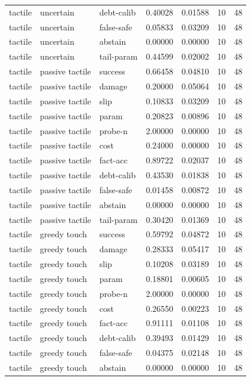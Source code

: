\documentclass{article}
\begin{document}
\begin{center}
\begin{longtable}{lllllll}
tactile & uncertain & debt-calib & 0.40028 & 0.01588 & 10 & 48 \\
tactile & uncertain & false-safe & 0.05833 & 0.03209 & 10 & 48 \\
tactile & uncertain & abstain & 0.00000 & 0.00000 & 10 & 48 \\
tactile & uncertain & tail-param & 0.44599 & 0.02002 & 10 & 48 \\
tactile & passive tactile & success & 0.66458 & 0.04810 & 10 & 48 \\
tactile & passive tactile & damage & 0.20000 & 0.05064 & 10 & 48 \\
tactile & passive tactile & slip & 0.10833 & 0.03209 & 10 & 48 \\
tactile & passive tactile & param & 0.20823 & 0.00896 & 10 & 48 \\
tactile & passive tactile & probe-n & 2.00000 & 0.00000 & 10 & 48 \\
tactile & passive tactile & cost & 0.24000 & 0.00000 & 10 & 48 \\
tactile & passive tactile & fact-acc & 0.89722 & 0.02037 & 10 & 48 \\
tactile & passive tactile & debt-calib & 0.43530 & 0.01838 & 10 & 48 \\
tactile & passive tactile & false-safe & 0.01458 & 0.00872 & 10 & 48 \\
tactile & passive tactile & abstain & 0.00000 & 0.00000 & 10 & 48 \\
tactile & passive tactile & tail-param & 0.30420 & 0.01369 & 10 & 48 \\
tactile & greedy touch & success & 0.59792 & 0.04872 & 10 & 48 \\
tactile & greedy touch & damage & 0.28333 & 0.05417 & 10 & 48 \\
tactile & greedy touch & slip & 0.10208 & 0.03189 & 10 & 48 \\
tactile & greedy touch & param & 0.18801 & 0.00605 & 10 & 48 \\
tactile & greedy touch & probe-n & 2.00000 & 0.00000 & 10 & 48 \\
tactile & greedy touch & cost & 0.26550 & 0.00223 & 10 & 48 \\
tactile & greedy touch & fact-acc & 0.91111 & 0.01108 & 10 & 48 \\
tactile & greedy touch & debt-calib & 0.39493 & 0.01429 & 10 & 48 \\
tactile & greedy touch & false-safe & 0.04375 & 0.02148 & 10 & 48 \\
tactile & greedy touch & abstain & 0.00000 & 0.00000 & 10 & 48 \\
\bottomrule
\end{longtable}
\renewcommand{\arraystretch}{1.0}
\end{center}
\end{document}
